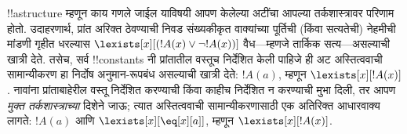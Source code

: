 \documentclass[../../../include/open-logic-section]{subfiles}
\begin{document}
\begin{digress}
!!a{structure} म्हणून काय गणले जाईल याविषयी आपण केलेल्या अटींचा आपल्या
तर्कशास्त्रावर परिणाम होतो. उदाहरणार्थ, प्रांत अरिक्त ठेवण्याची निवड
संख्यकीकृत वाक्यांच्या पूर्तिची (किंवा सत्यतेची) नेहमीची मांडणी गृहीत
धरल्यास $\lexists[x][(!A(x) \lor \lnot !A(x))]$ वैध---म्हणजे तार्किक
सत्य---असल्याची खात्री देते. तसेच, सर्व !!{constant}s नी प्रांतातील
वस्तूच निर्देशित केली पाहिजे ही अट अस्तित्ववाची सामान्यीकरण हा
निर्दोष अनुमान-रूपबंध असल्याची खात्री देते: $!A(a)$, म्हणून
$\lexists[x][!A(x)]$. नावांना प्रांताबाहेरील वस्तू निर्देशित करण्याची
किंवा काहीच निर्देशित न करण्याची मुभा दिली, तर आपण \emph{मुक्त
तर्कशास्त्राच्या} दिशेने जाऊ; त्यात अस्तित्ववाची सामान्यीकरणासाठी एक
अतिरिक्त आधारवाक्य लागते: $!A(a)$ आणि $\lexists[x][\eq[x][a]]$, म्हणून
$\lexists[x][!A(x)]$.
\end{digress}
\end{document}
